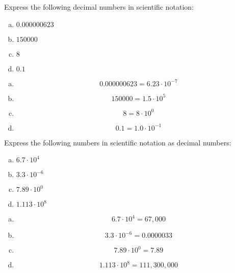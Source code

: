 \documentclass[11pt,letterpaper]{article}
\begin{document}

 Express the following decimal numbers in scientific notation:
	\begin{enumerate}[(a)]
	\item $0.000000623$
	\item $150000$
	\item $8$
	\item $0.1$
	\end{enumerate} \pspace

\sol 
\begin{enumerate}[(a)]
\item 
	\[
	0.000000623= 6.23 \cdot 10^{-7}
	\] \pspace

\item 
	\[
	150000= 1.5 \cdot 10^5
	\] \pspace

\item 
	\[
	8= 8 \cdot 10^0
	\] \pspace

\item 
	\[
	0.1= 1.0 \cdot 10^{-1}
	\]
\end{enumerate}



\newpage



 Express the following numbers in scientific notation as decimal numbers:
	\begin{enumerate}[(a)]
	\item $6.7 \cdot 10^4$
	\item $3.3 \cdot 10^{-6}$
	\item $7.89 \cdot 10^0$
	\item $1.113 \cdot 10^8$
	\end{enumerate} \pspace

\sol 
\begin{enumerate}[(a)]
\item 
	\[
	6.7 \cdot 10^4= 67,\!000
	\] \pspace

\item 
	\[
	3.3 \cdot 10^{-6}= 0.0000033
	\] \pspace

\item 
	\[
	7.89 \cdot 10^0= 7.89
	\] \pspace

\item 
	\[
	1.113 \cdot 10^8= 111,\!300,\!000
	\] 
\end{enumerate}
\end{document}

